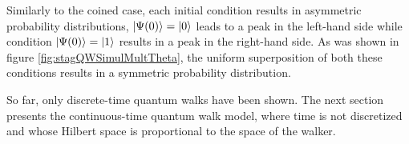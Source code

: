 \documentclass[../../dissertation.tex]{subfiles}
\begin{document}
Similarly to the coined case, each initial condition results in asymmetric
probability distributions, $\ket{\Psi(0)}=\ket{0}$ leads to a peak  in the
left-hand side while condition $\ket{\Psi(0)}=\ket{1}$ results in a peak in the
right-hand side. As was shown in figure \ref{fig:stagQWSimulMultTheta}, the
uniform superposition of both these conditions results in a symmetric
probability distribution.\par So far, only discrete-time quantum walks have
been shown. The next section presents the continuous-time quantum walk model,
where time is not discretized and whose Hilbert space is proportional to the
space of the walker.

\end{document}
